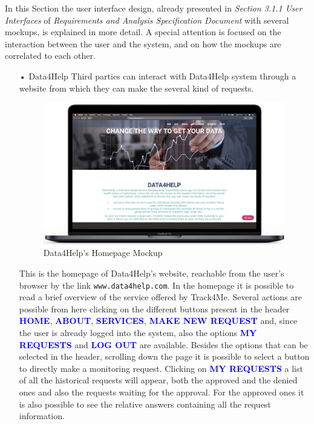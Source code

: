 \noindent
In this Section the user interface design, already presented in  \textit{Section 3.1.1 User Interfaces} of \textit{Requirements and Analysis Specification Document} with several mockups, is explained in more detail. A special attention is focused on the interaction between the user and the system, and on how the mockups are correlated to each other.
\bigbreak
\noindent
\begin{enumerate}
\item[•]{\Large Data4Help}
\bigbreak
\noindent
Third parties can interact with Data4Help system through a website from which they can make the several kind of requests.
\begin{figure}[H]
        \centering
          \includegraphics[scale = 0.33]{Images/Mockups/Homepage.jpg}
          	\caption{Data4Help's Homepage Mockup}
\end{figure}
This is the homepage of Data4Help's website, reachable from the user's browser by the link \texttt{www.data4help.com}. In the homepage it is possible to read a brief overview of the service offered by Track4Me. Several actions are possible from here clicking on the different buttons present in the header {\textcolor{Blue}{\textbf{HOME}}}, {\textcolor{Blue}{\textbf{ABOUT}}}, {\textcolor{Blue}{\textbf{SERVICES}}}, {\textcolor{Blue}{\textbf{MAKE NEW REQUEST}}} and, since the user is already logged into the system, also the options {\textcolor{Blue}{\textbf{MY REQUESTS}}} and {\textcolor{Blue}{\textbf{LOG OUT}}} are available. Besides the options that can be selected in the header, scrolling down the page it is possible to select a button to directly make a monitoring request. 
\bigbreak
\noindent
Clicking on {\textcolor{Blue}{\textbf{MY REQUESTS}}} a list of all the historical requests will appear, both the approved and the denied ones and also the requests waiting for the approval. For the approved ones it is also possible to see the relative answers containing all the request information.
\clearpage


\end{enumerate}
